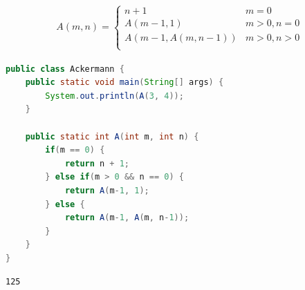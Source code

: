 \vspace{0.5cm}


\begin{align}\nonumber
	A(m, n) =
	\begin{cases}
		n + 1             & m = 0        \\
		A(m-1, 1)         & m > 0, n = 0 \\
		A(m-1, A(m, n-1)) & m > 0, n > 0 \\
	\end{cases}
\end{align}

\begin{lstlisting}[language=Java]
public class Ackermann {
	public static void main(String[] args) {
		System.out.println(A(3, 4));
	}
	
	public static int A(int m, int n) {
		if(m == 0) {
			return n + 1;
		} else if(m > 0 && n == 0) {
			return A(m-1, 1);
		} else {
			return A(m-1, A(m, n-1));
		}
	}
}
\end{lstlisting}

\begin{tcolorbox}
	\begin{verbatim}
125
	\end{verbatim}
\end{tcolorbox}

